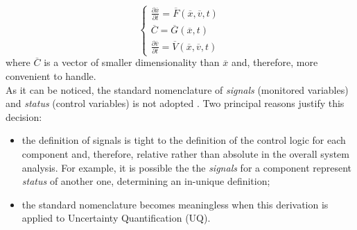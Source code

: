 \begin{equation}
\label{eq:controlVars}
\left\{\begin{matrix}
\frac{\partial \overline{x} }{\partial t} = \overline{F}\left (  \overline{x}, \overline{v}, t \right )  \\ 
 \overline{C} =  \overline{G}(\overline{x},t)     \\
\frac{\partial \overline{v} }{\partial t} = \overline{V}\left (  \overline{x}, \overline{v}, t \right )
\end{matrix}\right.
\end{equation}
where $\overline{C}$ is a vector of smaller dimensionality than $\overline{x}$ and,
therefore, more convenient to handle.
\\As it can be noticed, the standard nomenclature of \textit{signals} (monitored variables) and \textit{status} (control variables) is not adopted . Two principal reasons 
justify this decision:
\begin{itemize}
  \item the definition of signals is tight to the definition of the 
  control logic for each component and, therefore, relative rather than absolute in the 
  overall system analysis. For example, it is possible the the \textit{signals} for a 
  component represent \textit{status} of another one, determining an in-unique 
  definition;
  \item the standard nomenclature becomes meaningless when this derivation is 
  applied to Uncertainty Quantification (UQ).
\end{itemize}


